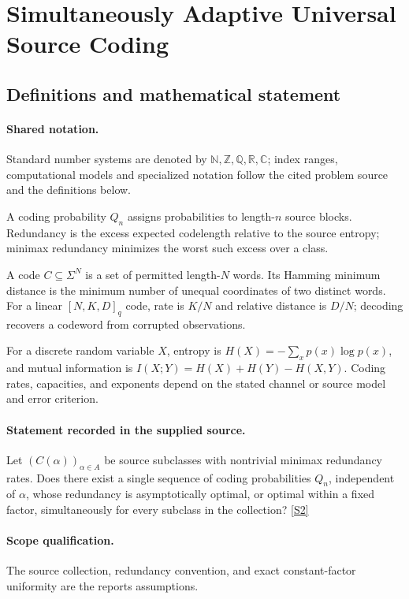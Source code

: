 \documentclass[11pt]{article}
\newcommand{\sref}[2]{\hyperlink{source:#1:#2}{[S#2]}}
\begin{document}
\section{Simultaneously Adaptive Universal Source Coding}\label{statement}

\subsection{Definitions and mathematical statement}

\paragraph{Shared notation.}Standard number systems are denoted by $\mathbb N,\mathbb Z,\mathbb Q,\mathbb R,\mathbb C$; index ranges, computational models and specialized notation follow the cited problem source and the definitions below.


A coding probability $Q_n$ assigns probabilities to length-$n$ source blocks. Redundancy is the excess expected codelength relative to the source entropy; minimax redundancy minimizes the worst such excess over a class.

A code $C\subseteq\Sigma^N$ is a set of permitted length-$N$ words. Its Hamming minimum distance is the minimum number of unequal coordinates of two distinct words. For a linear $[N,K,D]_q$ code, rate is $K/N$ and relative distance is $D/N$; decoding recovers a codeword from corrupted observations.

For a discrete random variable $X$, entropy is $H(X)=-\sum_xp(x)\log p(x)$, and mutual information is $I(X;Y)=H(X)+H(Y)-H(X,Y)$. Coding rates, capacities, and exponents depend on the stated channel or source model and error criterion.
\paragraph{Statement recorded in the supplied source.}
Let $(C(\alpha))_{\alpha\in A}$ be source subclasses with nontrivial minimax redundancy rates. Does there exist a single sequence of coding probabilities $Q_n$, independent of $\alpha$, whose redundancy is asymptotically optimal, or optimal within a fixed factor, simultaneously for every subclass in the collection? \sref{statement}{2}
\paragraph{Scope qualification.}
The source collection, redundancy convention, and exact constant-factor uniformity are the report\textquotesingle s assumptions.
\end{document}
